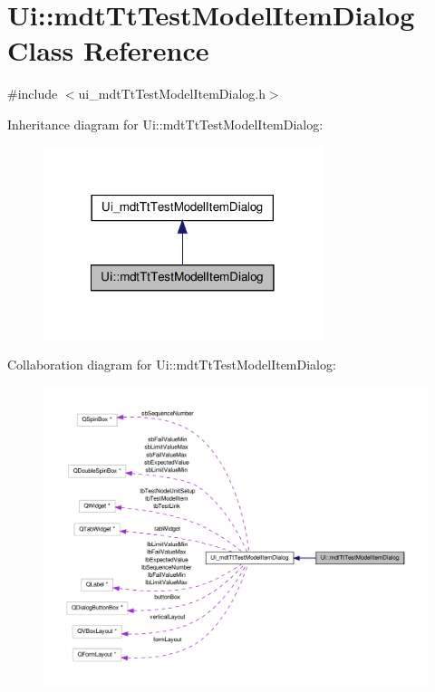 \hypertarget{class_ui_1_1mdt_tt_test_model_item_dialog}{\section{Ui\-:\-:mdt\-Tt\-Test\-Model\-Item\-Dialog Class Reference}
\label{class_ui_1_1mdt_tt_test_model_item_dialog}
}


{\ttfamily \#include $<$ui\-\_\-mdt\-Tt\-Test\-Model\-Item\-Dialog.\-h$>$}



Inheritance diagram for Ui\-:\-:mdt\-Tt\-Test\-Model\-Item\-Dialog\-:
\nopagebreak
\begin{figure}[H]
\begin{center}
\leavevmode
\includegraphics[width=230pt]{class_ui_1_1mdt_tt_test_model_item_dialog__inherit__graph}
\end{center}
\end{figure}


Collaboration diagram for Ui\-:\-:mdt\-Tt\-Test\-Model\-Item\-Dialog\-:
\nopagebreak
\begin{figure}[H]
\begin{center}
\leavevmode
\includegraphics[width=350pt]{class_ui_1_1mdt_tt_test_model_item_dialog__coll__graph}
\end{center}
\end{figure}
